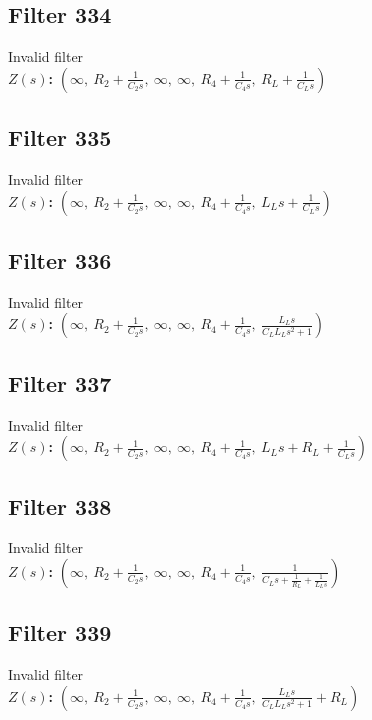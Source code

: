 \documentclass{article}
\begin{document}
\subsection*{Filter 334}
Invalid filter \\ 
\textbf{$Z(s)$:} $\left( \infty, \  R_{2} + \frac{1}{C_{2} s}, \  \infty, \  \infty, \  R_{4} + \frac{1}{C_{4} s}, \  R_{L} + \frac{1}{C_{L} s}\right)$ \\ 
\subsection*{Filter 335}
Invalid filter \\ 
\textbf{$Z(s)$:} $\left( \infty, \  R_{2} + \frac{1}{C_{2} s}, \  \infty, \  \infty, \  R_{4} + \frac{1}{C_{4} s}, \  L_{L} s + \frac{1}{C_{L} s}\right)$ \\ 
\subsection*{Filter 336}
Invalid filter \\ 
\textbf{$Z(s)$:} $\left( \infty, \  R_{2} + \frac{1}{C_{2} s}, \  \infty, \  \infty, \  R_{4} + \frac{1}{C_{4} s}, \  \frac{L_{L} s}{C_{L} L_{L} s^{2} + 1}\right)$ \\ 
\subsection*{Filter 337}
Invalid filter \\ 
\textbf{$Z(s)$:} $\left( \infty, \  R_{2} + \frac{1}{C_{2} s}, \  \infty, \  \infty, \  R_{4} + \frac{1}{C_{4} s}, \  L_{L} s + R_{L} + \frac{1}{C_{L} s}\right)$ \\ 
\subsection*{Filter 338}
Invalid filter \\ 
\textbf{$Z(s)$:} $\left( \infty, \  R_{2} + \frac{1}{C_{2} s}, \  \infty, \  \infty, \  R_{4} + \frac{1}{C_{4} s}, \  \frac{1}{C_{L} s + \frac{1}{R_{L}} + \frac{1}{L_{L} s}}\right)$ \\ 
\subsection*{Filter 339}
Invalid filter \\ 
\textbf{$Z(s)$:} $\left( \infty, \  R_{2} + \frac{1}{C_{2} s}, \  \infty, \  \infty, \  R_{4} + \frac{1}{C_{4} s}, \  \frac{L_{L} s}{C_{L} L_{L} s^{2} + 1} + R_{L}\right)$ \\ 
\end{document}
